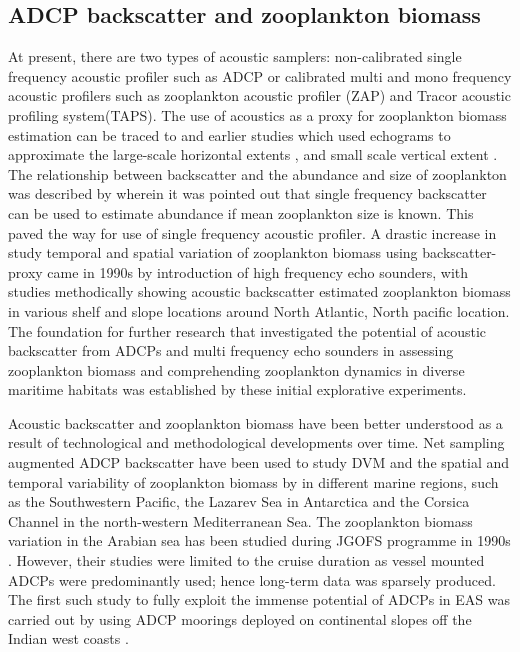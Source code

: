 \documentclass{article}
\begin{document}
	\subsection{ADCP backscatter and zooplankton biomass}
	At present, there are two types of acoustic samplers: non-calibrated single frequency acoustic profiler such as ADCP or calibrated multi and mono frequency acoustic profilers such as zooplankton acoustic profiler (ZAP) and Tracor acoustic profiling system(TAPS). The use of acoustics as a proxy for zooplankton biomass estimation can be traced to \citep{pieper1971study, sameoto1977use} and earlier studies which used echograms to approximate the large-scale horizontal extents \citep{barraclough1969shallow}, and small scale vertical extent \citep{mcnaught1968acoustical}. The relationship between backscatter and the abundance and size of zooplankton was described by \citep{greenlaw1979acoustical} 
	wherein it was pointed out that single frequency backscatter can be used to estimate abundance if mean zooplankton size is known. This paved the way for use of single frequency acoustic profiler. A drastic increase in study temporal and spatial variation of zooplankton biomass using  backscatter-proxy came in 1990s by introduction of high frequency echo sounders, with studies \citep{flagg1989use, wiebe1990sound, batchelder00981, greene1998three, rippeth1998diur} methodically showing acoustic backscatter estimated zooplankton biomass in various shelf and slope locations around  North Atlantic, North pacific location. The foundation for further research that investigated the potential of acoustic backscatter from ADCPs and multi frequency echo sounders in assessing zooplankton biomass and comprehending zooplankton dynamics in diverse maritime habitats was established by these initial explorative experiments.
	
	 Acoustic backscatter and zooplankton biomass have been better understood as a result of technological and methodological developments over time. Net sampling augmented ADCP backscatter have been used to study DVM and the spatial and temporal variability of zooplankton biomass by \citep{cisewski2010seasonal,hamilton2013links,smeti2015spatial, guerra2019zooplankton} in different marine regions, such as the Southwestern Pacific, the Lazarev Sea in Antarctica and the Corsica Channel in the north-western Mediterranean Sea.	The zooplankton biomass variation in the Arabian sea has been studied during JGOFS programme in 1990s \citep{herring1998across, nair1999arabian, fielding2004biological, smith2005mesozooplankton}. However, their studies were limited to the cruise duration as vessel mounted ADCPs were predominantly used; hence long-term data was sparsely produced. The first such study to fully exploit the immense potential of ADCPs in EAS was carried out by \citep{aparna2022seasonal} using ADCP moorings deployed on continental slopes off the Indian west coasts \citep{amol2014observed, chaudhuri2020observed}.
	
\end{document}
